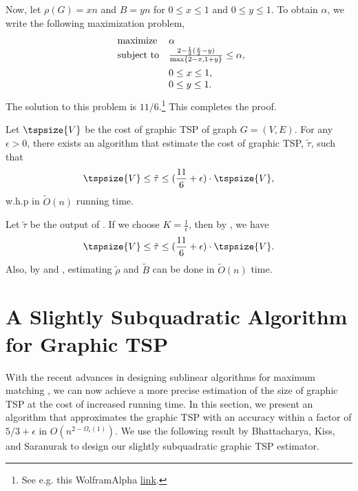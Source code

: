 \begin{myproof}
Now, let $\rho(G) = xn$ and $B = yn$ for $0 \leq x \leq 1$ and $ 0\leq y \leq 1$. To obtain $\alpha$, we write the following maximization problem,
\begin{align*}
\begin{array}{ll@{}ll}
\text{maximize}  & \alpha \\
\vspace{5px}\text{subject to}& \frac{2 - \frac{1}{3}(\frac{x}{2} - y)}{\max\{2-x, 1+y\}} \leq \alpha,\\
                & 0\leq x \leq 1,\\
                 & 0\leq y \leq 1.
\end{array}
\end{align*}
The solution to this problem is $11/6$.\footnote{See e.g. this WolframAlpha  \href{https://www.wolframalpha.com/input?i=Maximize\%5B\%282-1\%2F3*\%28x\%2F2+-+y\%29\%29+\%2F+Max\%5B2-x\%2C+1\%2By\%5D\%2C+\%7B0\%3C\%3D+x+\%3C\%3D1\%2C+0\%3C\%3Dy\%3C\%3D1\%7D\%2C+\%7Bx\%2Cy\%7D\%5D}{link}.} This completes the proof.
\end{myproof}


\begin{theorem}\label{thm: graphic-tsp2}
Let $\tspsize{V}$ be the cost of graphic TSP of graph $G = (V, E)$. For any $\epsilon > 0$, there exists an algorithm that estimate the cost of graphic TSP, $\tilde{\tau}$, such that
$$
\tspsize{V} \leq \tilde{\tau} \leq (\frac{11}{6} + \epsilon) \cdot \tspsize{V},
$$
w.h.p in $\tilde{O}(n)$ running time. \vspace{3px}
\end{theorem}
\begin{myproof}
Let $\tilde{\tau}$ be the output of . If we choose $K = \frac{1}{\epsilon}$, then by , we have 
$$
\tspsize{V} \leq \tilde{\tau} \leq (\frac{11}{6} + \epsilon) \cdot \tspsize{V}.
$$
Also, by  and , estimating $\tilde{\rho}$ and $\tilde{B}$ can be done in $\tilde{O}(n)$ time.
\end{myproof}




\section{A Slightly Subquadratic Algorithm for Graphic TSP}\label{sec:graphic-TSP-slightly-sub}

With the recent advances in designing sublinear algorithms for maximum matching \cite{ behnezhadroghanirubinstein2022, BehnezhadRRS-ArXiv22, sayanSublinear2022, bhattacharya2023dynamic}, we can now achieve a more precise estimation of the size of graphic TSP at the cost of increased running time. In this section, we present an algorithm that approximates the graphic TSP with an accuracy within a factor of $5/3 + \epsilon$ in $O(n^{2-\Omega_\epsilon(1)})$. We use the following result by Bhattacharya, Kiss, and Saranurak \cite{bhattacharya2023dynamic} to design our slightly subquadratic graphic TSP estimator.

